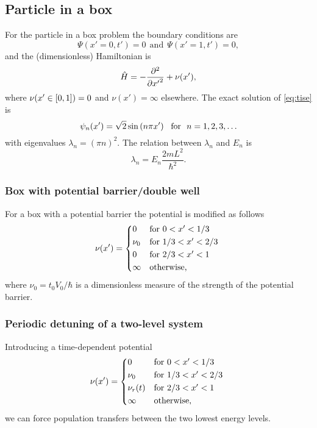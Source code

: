 \subsection*{Particle in a box}
For the particle in a box problem the boundary conditions are
\begin{equation}
    \Psi(x'=0, t') = 0 ~~\text{and}~~ \Psi(x'=1, t') = 0,
\end{equation}
and the (dimensionless) Hamiltonian is 
\begin{equation}
    \hat H = -\pd[2]{}{{x'}} + \nu(x'),
\end{equation}
where $\nu(x'\in \sbr{0, 1}) = 0$ and $\nu(x') = \infty$ elsewhere. The exact solution of \cref{eq:tise} is
\begin{equation}
    \psi_n(x') = \sqrt{2}\sin\del{n\pi x'} ~~\text{for}~~ n=1,2,3,\dots
    \label{eq:exact_eigenfunctions}
\end{equation}
with eigenvalues $\lambda_n = (\pi n)^2$. The relation between $\lambda_n$ and $E_n$ is
\begin{equation}
    \lambda_n = E_n \frac{2mL^2}{\hbar^2}.
\end{equation}

\subsubsection*{Box with potential barrier/double well}
For a box with a potential barrier the potential is modified as follows
\begin{equation}
\nu(x') = 
\begin{cases*}
    0 & for $0 < x' < 1/3$ \\
    \nu_0 & for $1/3 < x' < 2/3$ \\
    0 & for $2/3 < x' < 1$ \\
    \infty & otherwise,
\end{cases*}
\end{equation}
where $\nu_0 = t_0 V_0/\hbar$ is a dimensionless measure of the strength of the potential barrier.

\subsubsection{Periodic detuning of a two-level system}
Introducing a time-dependent potential
\begin{equation}
\nu(x') = 
\begin{cases*}
    0 & for $0 < x' < 1/3$ \\
    \nu_0 & for $1/3 < x' < 2/3$ \\
    \nu_r(t) & for $2/3 < x' < 1$ \\
    \infty & otherwise,
\end{cases*}
\end{equation}
we can force population transfers between the two lowest energy levels.

